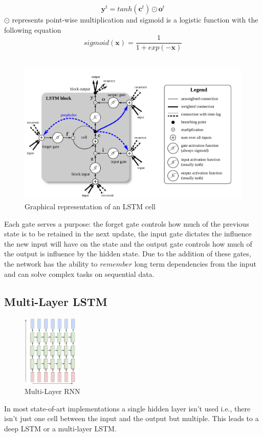 \begin{equation}
\mathbf{y}^t = tanh(\mathbf{c}^t)\odot\mathbf{o}^t
\end{equation}
$\odot$ represents point-wise multiplication and sigmoid is a logistic function with the following equation 
\[sigmoid(\mathbf{x}) = \frac{1}{1+exp(-\mathbf{x})}\]\\


\begin{figure}[h]
\caption{Graphical representation of an LSTM cell}
\centering
\includegraphics[width=\textwidth]{lstm}
\end{figure}


Each gate serves a purpose: the forget gate controls how much of the previous state is to be retained in the next update, the input gate dictates the influence the new input will have on the state and the output gate controls how much of the output is influence by the hidden state. Due to the addition of these gates, the network has the ability to $remember$ long term dependencies from the input and can solve complex tasks on sequential data.

\subsection{Multi-Layer LSTM}
\begin{figure}[h] 
	\caption{Multi-Layer RNN}    
    \centering
    \includegraphics[width=0.25\textwidth]{multi-layer}
\end{figure}
In most state-of-art implementations a single hidden layer isn't used i.e., there isn't just one cell between the input and the output but multiple. This leads to a deep LSTM or a multi-layer LSTM.
